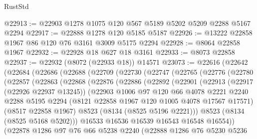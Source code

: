 \begin{lexlean}{RustStd}
\begin{coremodule}
@22913 := @22903 @1278 @1075 @120 @567 @5189 @5202 @5209 @2288 @5167 @2294
@22917 := @22888 @1278 @120 @5185 @5187
@22926 := @13222 @22858 @1967 @86 @120 @76 @3161 @3009 @5175 @2294
@22928 := @8064 @22858 @1967
@22932 := @22928 @18 @627 @18 @3161
@22933 := @8073 @22858
@22937 := @22932 (@8072 (@22933 @18)) @14571
@23073 := @22616
    (@22642
      (@22684
        (@22686
          (@22688
            (@22709
              (@22730
                (@22747
                  (@22765
                    (@22776
                      (@22780
                        (@22857
                          (@22863
                            (@22868
                              (@22876
                                (@22886
                                  (@22892
                                    (@22901
                                      (@22913
                                        (@22917 (@22926 @22937 @13245))
                                        (@22903
                                          @1006
                                          @97
                                          @120
                                          @66
                                          @4078
                                          @2221
                                          @2240
                                          @2288
                                          @5195
                                          @2294
                                          (@8121 @22858 @1967 @120 @1005 @4078 @17567 @17571)
                                          (@8517 @22858 @1967)
                                          @8523
                                          (@8134 (@8525 @5196 @2221)))
                                        @8523
                                        (@8134 (@8525 @5168 @5202)))
                                      @16533
                                      @16536
                                      @16539
                                      @16543
                                      @16548
                                      @16554))
                                  (@22878
                                    @1286
                                    @97
                                    @76
                                    @66
                                    @5238
                                    @2240
                                    (@22888
                                      @1286
                                      @76
                                      @5230
                                      @5236

\end{coremodule}
\end{lexlean}

